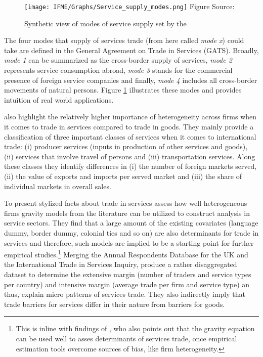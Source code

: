 \begin{figure}[htbp]
    \centering
    \caption[Synthetic view of modes of service supply]{Synthetic view of modes of service supply set by the \textcite{eurostat2002manual}}
    \texttt{[image: IFME/Graphs/Service\_supply\_modes.png]}
    \label{fig:service_modes}
    \small 
    Figure Source: \cite[p. 25]{eurostat2002manual}
\end{figure}



The four modes that supply of services trade (from here called \textit{mode x}) could take are defined in the General Agreement on Trade in Services (GATS). Broadly, \textit{mode 1} can be summarized as the cross-border supply of services, \textit{mode 2} represents service consumption abroad, \textit{mode 3} stands for the commercial presence of foreign service companies and finally, \textit{mode 4} includes all cross-border movements of natural persons. Figure \ref{fig:service_modes} illustrates these modes and provides intuition of real world applications.









\textcite{Breinlich_and} also highlight the relatively higher importance of heterogeneity across firms when it comes to trade in services compared to trade in goods. They mainly provide a classification of three important classes of services when it comes to international trade: (i) producer services (inputs in production of other services and goods), (ii) services that involve travel of persons and (iii) transportation services. Along these classes they identify differences in (i) the number of foreign markets served, (ii) the value of exports and imports per served market and (iii) the share of individual markets in overall sales. 

To present stylized facts about trade in services \textcite{Breinlich_and} assess how well heterogeneous firms gravity models from the literature can be utilized to construct analysis in service sectors. They find that a large amount of the existing covariates (language dummy, border dummy, colonial ties and so on) are also determinants for trade in services and therefore, such models are implied to be a starting point for further empirical studies.\footnote{This is inline with findings of \textcite{Walsh2006}, who also points out that the gravity equation can be used well to asses determinants of services trade, once empirical estimation tools overcome sources of bias, like firm heterogeneity.} Merging the Annual Respondents Database for the UK and the International Trade in Services Inquiry, \textcite{Breinlich_and} produce a rather disaggregated dataset to determine the extensive margin (number of traders and service types per country) and intensive margin (average trade per firm and service type) an thus, explain micro patterns of services trade. They also indirectly imply that trade barriers for services differ in their nature from barriers for goods. 




